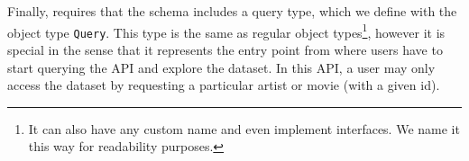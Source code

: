Finally, \gql requires that the schema includes a query type, which we define with the object type \texttt{Query}. 
This type is the same as regular object types\footnote{It can also have any custom name and even implement interfaces. We name it this way for readability purposes.}, 
however it is special in the sense that it represents the entry point from where users have to 
start querying the API and explore the dataset. In this API, a user may only access the \goodbois dataset by
requesting a particular artist or movie (with a given id).







